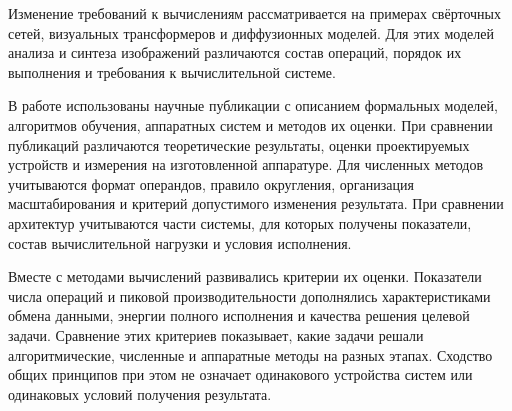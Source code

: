 Изменение требований к вычислениям рассматривается на примерах
свёрточных сетей, визуальных трансформеров и диффузионных моделей.
Для этих моделей анализа и синтеза изображений различаются состав операций,
порядок их выполнения и требования к вычислительной системе.

В работе использованы научные публикации с описанием формальных моделей,
алгоритмов обучения, аппаратных систем и методов их оценки. При сравнении
публикаций различаются теоретические результаты, оценки проектируемых
устройств и измерения на изготовленной аппаратуре. Для численных методов учитываются
формат операндов, правило округления, организация масштабирования
и критерий допустимого изменения результата. При сравнении архитектур
учитываются части системы, для которых получены показатели,
состав вычислительной нагрузки и условия исполнения.

Вместе с методами вычислений развивались критерии их оценки. Показатели числа операций и пиковой
производительности дополнялись характеристиками обмена данными,
энергии полного исполнения и качества решения целевой задачи.
Сравнение этих критериев показывает, какие задачи решали алгоритмические,
численные и аппаратные методы на разных этапах. Сходство общих принципов при
этом не означает одинакового устройства систем или одинаковых условий
получения результата.
